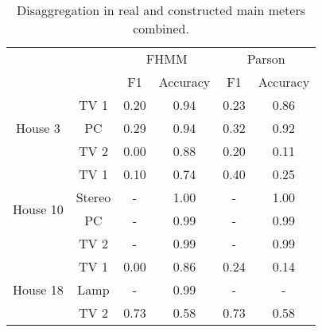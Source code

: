 \begin{table}[H]                             
\centering                                   
\begin{tabular}{cc|c|c|c|c|}
\cline{3-6}
\multicolumn{1}{l}{}                            &        & \multicolumn{2}{c|}{FHMM} & \multicolumn{2}{c|}{Parson} \\ \cline{3-6} 
\multicolumn{1}{l}{}                            &        & F1        & Accuracy      & F1         & Accuracy       \\ \hline
\multicolumn{1}{|c|}{\multirow{3}{*}{House 3}}  & TV 1   & 0.20      & 0.94          & 0.23       & 0.86           \\ \cline{2-6} 
\multicolumn{1}{|c|}{}                          & PC     & 0.29      & 0.94          & 0.32       & 0.92           \\ \cline{2-6} 
\multicolumn{1}{|c|}{}                          & TV 2   & 0.00      & 0.88          & 0.20       & 0.11           \\ \hline
\multicolumn{1}{|c|}{\multirow{4}{*}{House 10}} & TV 1   & 0.10      & 0.74          & 0.40       & 0.25           \\ \cline{2-6} 
\multicolumn{1}{|c|}{}                          & Stereo & -         & 1.00          & -          & 1.00           \\ \cline{2-6} 
\multicolumn{1}{|c|}{}                          & PC     & -         & 0.99          & -          & 0.99           \\ \cline{2-6} 
\multicolumn{1}{|c|}{}                          & TV 2   & -         & 0.99          & -          & 0.99           \\ \hline
\multicolumn{1}{|c|}{\multirow{3}{*}{House 18}} & TV 1   & 0.00      & 0.86          & 0.24       & 0.14           \\ \cline{2-6} 
\multicolumn{1}{|c|}{}                          & Lamp   & -         & 0.99          & -          & -              \\ \cline{2-6} 
\multicolumn{1}{|c|}{}                          & TV 2   & 0.73      & 0.58          & 0.73       & 0.58           \\ \hline
\end{tabular}                                
\caption{Disaggregation in real and constructed main meters combined.}                     
\label{table:Tab:SHGREALSIM}                 
\end{table}    
